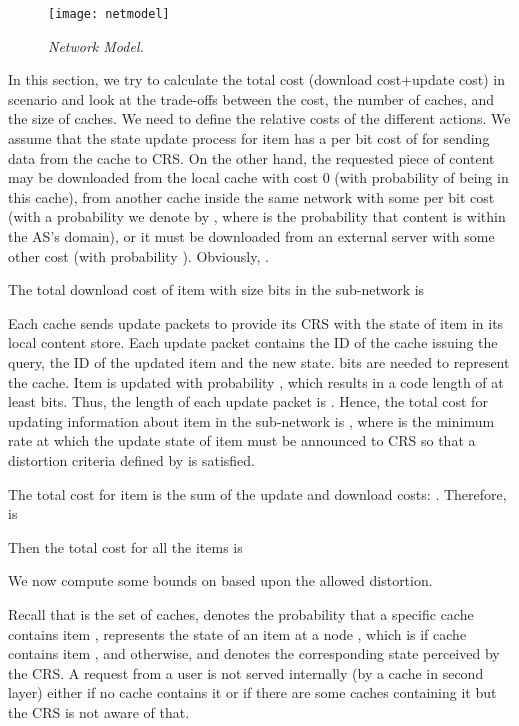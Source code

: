 \documentclass[conference]{IEEEtran}
\theoremstyle{plain}
\theoremstyle{remark}
\begin{document}
\begin{figure}[http]
    \center
      \texttt{[image: netmodel]}\\
      \caption{\textit{Network Model.}}
    \label{fig:netmodel}
\end{figure}

In this section, we try to calculate the total cost (download cost+update cost) in scenario  and look at the trade-offs between the cost, the number of caches, and the size of caches. We need to define the relative costs of the different actions. We assume that the state update process for item  has a per bit cost of  for sending data from the cache to CRS. On the other hand, the requested piece of content  may be downloaded from the local cache with cost 0 (with probability  of being in this cache), from another cache inside the same network with some per bit cost  (with a probability we denote by , where  is the probability that content  is within the AS's domain), or it must be downloaded from an external server with some other cost  (with probability ). Obviously, . 



The total download cost of item  with size  bits in the sub-network is


Each cache sends update packets to provide its CRS with the state of item  in its local content store. Each update packet contains the ID of the cache issuing the query, the ID of the updated item and the new state.  bits are needed to represent the cache. Item  is updated with probability , which results in a code length of at least  bits. Thus, the length of each update packet is . Hence, the total cost for updating information about item  in the sub-network is , where  is the minimum rate at which the update state of item  must be announced to CRS so that a distortion criteria defined by  is satisfied.

The total cost for item  is the sum of the update and download costs: . Therefore, is


Then the total cost for all the items is

We now compute some bounds on  based upon the allowed distortion.

Recall that   is the set of caches,  denotes the probability that a specific cache contains item ,  represents the state of an item  at a node , which is  if cache  contains item , and  otherwise, and  denotes the corresponding state perceived by the CRS. A request from a user is not served internally (by a cache in second layer) either if no cache contains it 
or if there are some caches containing it but the CRS is not aware of that.
\end{document}

